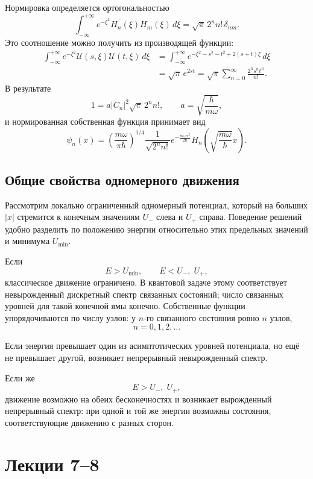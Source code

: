 \documentclass[12pt,a4paper]{article}
\begin{document}
Нормировка определяется ортогональностью
\[
    \int_{-\infty}^{+\infty}e^{-\xi^2}H_n(\xi)H_m(\xi)\,d\xi
    =\sqrt\pi\,2^n n!\,\delta_{nm}.
\]
Это соотношение можно получить из производящей функции:
\begin{align*}
    \int_{-\infty}^{+\infty}e^{-\xi^2}
    \mathcal U(s,\xi)\mathcal U(t,\xi)\,d\xi
    &=\int_{-\infty}^{+\infty}
      e^{-\xi^2-s^2-t^2+2(s+t)\xi}\,d\xi \\
    &=\sqrt\pi\,e^{2st}
    =\sqrt\pi\sum_{n=0}^{\infty}\frac{2^n s^nt^n}{n!}.
\end{align*}
В результате
\[
    1=a|C_n|^2\sqrt\pi\,2^n n!,
    \qquad a=\sqrt{\frac{\hbar}{m\omega}},
\]
и нормированная собственная функция принимает вид
\[
    \boxed{
    \psi_n(x)=
    \left(\frac{m\omega}{\pi\hbar}\right)^{1/4}
    \frac{1}{\sqrt{2^n n!}}
    e^{-\frac{m\omega x^2}{2\hbar}}
    H_n\!\left(\sqrt{\frac{m\omega}{\hbar}}x\right)}.
\]

\subsection{Общие свойства одномерного движения}

Рассмотрим локально ограниченный одномерный потенциал, который на больших
$|x|$ стремится к конечным значениям $U_-$ слева и $U_+$ справа. Поведение
решений удобно разделить по положению энергии относительно этих предельных
значений и минимума $U_{\min}$.

Если
\[
    E>U_{\min},
    \qquad
    E<U_-,\;U_+,
\]
классическое движение ограничено. В квантовой задаче этому соответствует
невырожденный дискретный спектр связанных состояний; число связанных
уровней для такой конечной ямы конечно. Собственные функции упорядочиваются
по числу узлов: у $n$-го связанного состояния ровно $n$ узлов,
\[
    n=0,1,2,\ldots
\]

Если энергия превышает один из асимптотических уровней потенциала, но ещё
не превышает другой, возникает непрерывный невырожденный спектр.

Если же
\[
    E>U_-,\;U_+,
\]
движение возможно на обеих бесконечностях и возникает вырожденный
непрерывный спектр: при одной и той же энергии возможны состояния,
соответствующие движению с разных сторон.
\section{Лекции 7--8}
\end{document}
